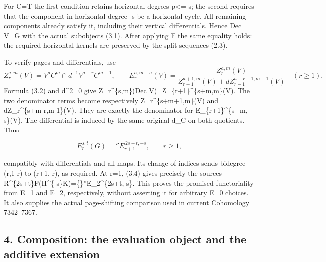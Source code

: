 For C\allowbreak{}=T the first condition retains horizontal degrees p<\allowbreak{}=-s; the second requires that the component in horizontal degree -s be a horizontal cycle. All remaining components already satisfy it,\allowbreak{} including their vertical differentials. Hence Dec V\allowbreak{}=G with the actual subobjects (3.1)\allowbreak{}. After applying F the same equality holds:\allowbreak{} the required horizontal kernels are preserved by the split sequences (2.3)\allowbreak{}.

To verify pages and differentials,\allowbreak{} use \[
 Z_r^{a,m}(V)=V^a C^m\cap d^{-1}V^{a+r}C^{m+1},\qquad
 E_r^{a,m-a}(V)=
 \frac{Z_r^{a,m}(V)}
 {Z_{r-1}^{a+1,m}(V)+dZ_{r-1}^{a-r+1,m-1}(V)}
 \quad(r\ge1).                                               \tag{3.3}
\] Formula (3.2)\allowbreak{} and d\textasciicircum{}2\allowbreak{}=0 give Z\_\allowbreak{}r\textasciicircum{}\{s,\allowbreak{}m\}(Dec V)\allowbreak{}\allowbreak{}=Z\_\allowbreak{}\{r\allowbreak{}+1\}\textasciicircum{}\{s\allowbreak{}+m,\allowbreak{}m\}(V)\allowbreak{}. The two denominator terms become respectively Z\_\allowbreak{}r\textasciicircum{}\{s\allowbreak{}+m\allowbreak{}+1,\allowbreak{}m\}(V)\allowbreak{} and dZ\_\allowbreak{}r\textasciicircum{}\{s\allowbreak{}+m-r,\allowbreak{}m-1\}(V)\allowbreak{}. They are exactly the denominator for E\_\allowbreak{}\{r\allowbreak{}+1\}\textasciicircum{}\{s\allowbreak{}+m,\allowbreak{}-s\}(V)\allowbreak{}. The differential is induced by the same original d\_\allowbreak{}C on both quotients. Thus

\[
 E_r^{s,t}(G)= {}''E_{r+1}^{\,2s+t,-s},\qquad r\ge1,            \tag{3.4}
\]

compatibly with differentials and all maps. Its change of indices sends bidegree (r,\allowbreak{}1-r)\allowbreak{} to (r\allowbreak{}+1,\allowbreak{}-r)\allowbreak{},\allowbreak{} as required. At r\allowbreak{}=1,\allowbreak{} (3.4)\allowbreak{} gives precisely the source\textquotesingle s R\textasciicircum{}\{2s\allowbreak{}+t\}F(H\textasciicircum{}\{-s\}K)\allowbreak{}\allowbreak{}=\{\}''E\_\allowbreak{}2\textasciicircum{}\{2s\allowbreak{}+t,\allowbreak{}-s\}. This proves the promised functoriality from E\_\allowbreak{}1 and E\_\allowbreak{}2,\allowbreak{} respectively,\allowbreak{} without asserting it for arbitrary E\_\allowbreak{}0 choices. It also supplies the actual page-shifting comparison used in current Cohomology 7342–\allowbreak{}7367.

\subsection{\texorpdfstring{4. Composition:\allowbreak{} the evaluation object and the additive extension}{4.  the evaluation object and the additive extension}}\label{proofs-7096-7578-composition-the-evaluation-object-and-the-additive-extension}

